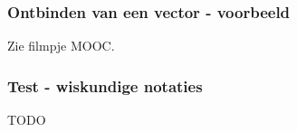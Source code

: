 \subsubsection{Ontbinden van een vector - voorbeeld}
Zie filmpje MOOC.

\subsubsection{Test - wiskundige notaties}
TODO
